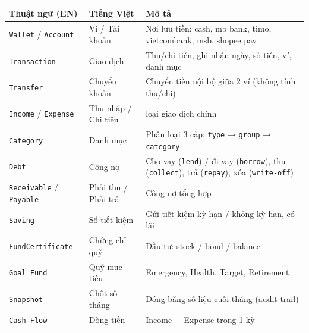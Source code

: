 \documentclass[11pt,a4paper]{article}
\newcounter{none}
\newcommand{\faintline}{\noalign{\global\arrayrulecolor{faintgray}}\hline\noalign{\global\arrayrulecolor{black}}} %
\begin{document}
{\def\LTcaptype{none}
\begin{longtable}[]{@{}
  >{\raggedright\arraybackslash}p{}
  >{\raggedright\arraybackslash}p{}
  >{\raggedright\arraybackslash}p{}@{}}
\toprule\noalign{}
\begin{minipage}[b]{\linewidth}\raggedright
Thuật ngữ (EN)
\end{minipage} & \begin{minipage}[b]{\linewidth}\raggedright
Tiếng Việt
\end{minipage} & \begin{minipage}[b]{\linewidth}\raggedright
Mô tả
\end{minipage} \\
\midrule\noalign{}
\endhead
\bottomrule\noalign{}
\endlastfoot
\texttt{Wallet} / \texttt{Account} & Ví / Tài khoản & Nơi lưu tiền: cash, mb bank, timo, vietcombank, msb, shopee pay \\ \faintline
\texttt{Transaction} & Giao dịch & Thu/chi tiền, ghi nhận ngày, số tiền, ví, danh mục \\ \faintline
\texttt{Transfer} & Chuyển khoản & Chuyển tiền nội bộ giữa 2 ví (không tính thu/chi) \\ \faintline
\texttt{Income} / \texttt{Expense} & Thu nhập / Chi tiêu & 2 loại giao dịch chính \\ \faintline
\texttt{Category} & Danh mục & Phân loại 3 cấp: \texttt{type} → \texttt{group} → \texttt{category} \\ \faintline
\texttt{Debt} & Công nợ & Cho vay (\texttt{lend}) / đi vay (\texttt{borrow}), thu (\texttt{collect}), trả (\texttt{repay}), xóa (\texttt{write-off}) \\ \faintline
\texttt{Receivable} / \texttt{Payable} & Phải thu / Phải trả & Công nợ tổng hợp \\ \faintline
\texttt{Saving} & Sổ tiết kiệm & Gửi tiết kiệm kỳ hạn / không kỳ hạn, có lãi \\ \faintline
\texttt{FundCertificate} & Chứng chỉ quỹ & Đầu tư: stock / bond / balance \\ \faintline
\texttt{Goal\ Fund} & Quỹ mục tiêu & Emergency, Health, Target, Retirement \\ \faintline
\texttt{Snapshot} & Chốt số tháng & Đóng băng số liệu cuối tháng (audit trail) \\ \faintline
\texttt{Cash\ Flow} & Dòng tiền & Income − Expense trong 1 kỳ \\
\end{longtable}
}
\end{document}
